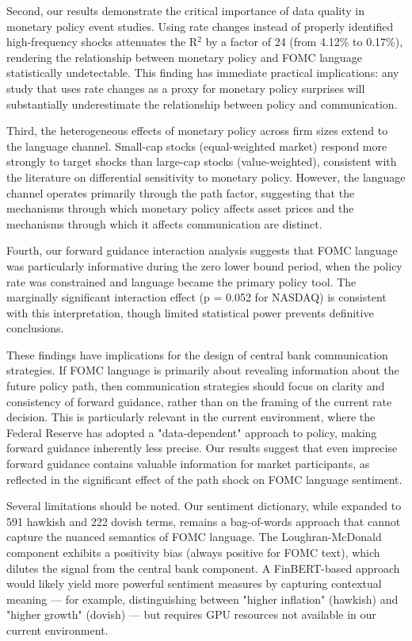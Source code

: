 \documentclass[12pt]{article}
\begin{document}
Second, our results demonstrate the critical importance of data quality in monetary policy event studies. Using rate changes instead of properly identified high-frequency shocks attenuates the R$^2$ by a factor of 24 (from 4.12\% to 0.17\%), rendering the relationship between monetary policy and FOMC language statistically undetectable. This finding has immediate practical implications: any study that uses rate changes as a proxy for monetary policy surprises will substantially underestimate the relationship between policy and communication.

Third, the heterogeneous effects of monetary policy across firm sizes extend to the language channel. Small-cap stocks (equal-weighted market) respond more strongly to target shocks than large-cap stocks (value-weighted), consistent with the literature on differential sensitivity to monetary policy. However, the language channel operates primarily through the path factor, suggesting that the mechanisms through which monetary policy affects asset prices and the mechanisms through which it affects communication are distinct.

Fourth, our forward guidance interaction analysis suggests that FOMC language was particularly informative during the zero lower bound period, when the policy rate was constrained and language became the primary policy tool. The marginally significant interaction effect (p = 0.052 for NASDAQ) is consistent with this interpretation, though limited statistical power prevents definitive conclusions.

These findings have implications for the design of central bank communication strategies. If FOMC language is primarily about revealing information about the future policy path, then communication strategies should focus on clarity and consistency of forward guidance, rather than on the framing of the current rate decision. This is particularly relevant in the current environment, where the Federal Reserve has adopted a "data-dependent" approach to policy, making forward guidance inherently less precise. Our results suggest that even imprecise forward guidance contains valuable information for market participants, as reflected in the significant effect of the path shock on FOMC language sentiment.

Several limitations should be noted. Our sentiment dictionary, while expanded to 591 hawkish and 222 dovish terms, remains a bag-of-words approach that cannot capture the nuanced semantics of FOMC language. The Loughran-McDonald component exhibits a positivity bias (always positive for FOMC text), which dilutes the signal from the central bank component. A FinBERT-based approach would likely yield more powerful sentiment measures by capturing contextual meaning --- for example, distinguishing between "higher inflation" (hawkish) and "higher growth" (dovish) --- but requires GPU resources not available in our current environment.
\end{document}
